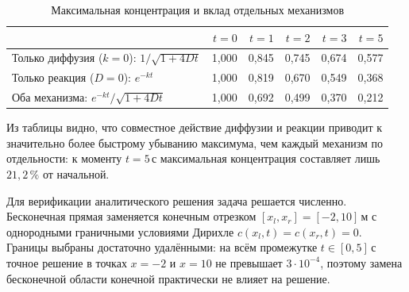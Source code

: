         \begin{table}[H]
            \centering
            \begin{tabular}{lrrrrr}
                \toprule
                & $t = 0$ & $t = 1$ & $t = 2$ & $t = 3$ & $t = 5$ \\
                \midrule
                Только диффузия ($k=0$): $1/\sqrt{1+4Dt}$
                    & 1{,}000 & 0{,}845 & 0{,}745 & 0{,}674 & 0{,}577 \\
                Только реакция ($D=0$): $e^{-kt}$
                    & 1{,}000 & 0{,}819 & 0{,}670 & 0{,}549 & 0{,}368 \\
                Оба механизма: $e^{-kt}/\sqrt{1+4Dt}$
                    & 1{,}000 & 0{,}692 & 0{,}499 & 0{,}370 & 0{,}212 \\
                \bottomrule
            \end{tabular}
            \caption{Максимальная концентрация и вклад отдельных механизмов}
            \label{tab:cmax}
        \end{table}

        Из таблицы видно, что совместное действие диффузии и реакции приводит
        к значительно более быстрому убыванию максимума, чем каждый механизм
        по отдельности: к моменту $t = 5$\,с максимальная концентрация составляет
        лишь $21{,}2\,\%$ от начальной.


        Для верификации аналитического решения задача решается численно.
        Бесконечная прямая заменяется конечным отрезком $[x_l, x_r] = [-2, 10]$\,м
        с однородными граничными условиями Дирихле $c(x_l, t) = c(x_r, t) = 0$.
        Границы выбраны достаточно удалёнными: на всём промежутке $t \in [0, 5]$\,с
        точное решение в точках $x = -2$ и $x = 10$ не превышает $3\cdot10^{-4}$,
        поэтому замена бесконечной области конечной практически не влияет на решение.

